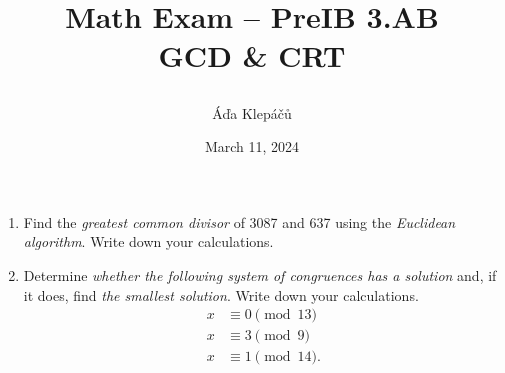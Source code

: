 \documentclass[a4paper,11pt]{article}
\title{\Huge\textsf{Math Exam -- PreIB 3.AB}\\
 \Large\textsf{GCD \& CRT}
 \author{Áďa Klepáčů}
 \date{March 11, 2024}
}
\begin{document}
\maketitle
\thispagestyle{fancy}

\begin{enumerate}
 \item Find the \emph{greatest common divisor} of 3087 and 637 using the
  \emph{Euclidean algorithm}. Write down your calculations.
 \item Determine \emph{whether the following system of congruences has a
  solution} and, if it does, find \emph{the smallest solution}. Write down your
  calculations.
  \begin{align*}
   x & \equiv 0 \pmod{13}\\
   x & \equiv 3 \pmod{9}\\
   x & \equiv 1 \pmod{14}.
  \end{align*}
\end{enumerate}
\end{document}
